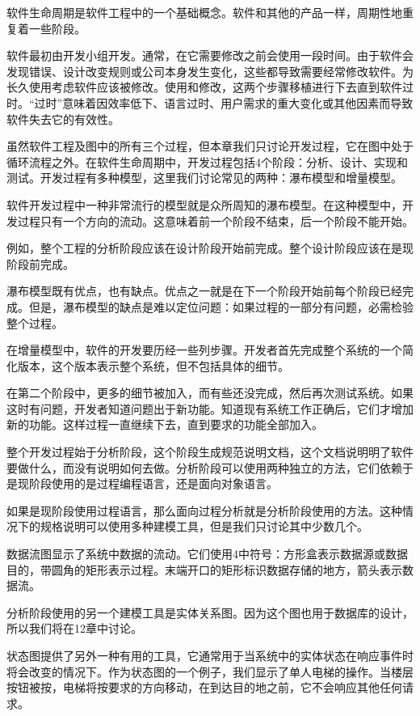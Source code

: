 软件生命周期是软件工程中的一个基础概念。软件和其他的产品一样，周期性地重复着一些阶段。

软件最初由开发小组开发。通常，在它需要修改之前会使用一段时间。由于软件会发现错误、设计改变规则或公司本身发生变化，这些都导致需要经常修改软件。为长久使用考虑软件应该被修改。使用和修改，这两个步骤移植进行下去直到软件过时。“过时”意味着因效率低下、语言过时、用户需求的重大变化或其他因素而导致软件失去它的有效性。

虽然软件工程及图中的所有三个过程，但本章我们只讨论开发过程，它在图中处于循环流程之外。在软件生命周期中，开发过程包括4个阶段：分析、设计、实现和测试。开发过程有多种模型，这里我们讨论常见的两种：瀑布模型和增量模型。

软件开发过程中一种非常流行的模型就是众所周知的瀑布模型。在这种模型中，开发过程只有一个方向的流动。这意味着前一个阶段不结束，后一个阶段不能开始。

例如，整个工程的分析阶段应该在设计阶段开始前完成。整个设计阶段应该在是现阶段前完成。

瀑布模型既有优点，也有缺点。优点之一就是在下一个阶段开始前每个阶段已经完成。但是，瀑布模型的缺点是难以定位问题：如果过程的一部分有问题，必需检验整个过程。

在增量模型中，软件的开发要历经一些列步骤。开发者首先完成整个系统的一个简化版本，这个版本表示整个系统，但不包括具体的细节。

在第二个阶段中，更多的细节被加入，而有些还没完成，然后再次测试系统。如果这时有问题，开发者知道问题出于新功能。知道现有系统工作正确后，它们才增加新的功能。这样过程一直继续下去，直到要求的功能全部加入。

整个开发过程始于分析阶段，这个阶段生成规范说明文档，这个文档说明明了软件要做什么，而没有说明如何去做。分析阶段可以使用两种独立的方法，它们依赖于是现阶段使用的是过程编程语言，还是面向对象语言。

如果是现阶段使用过程语言，那么面向过程分析就是分析阶段使用的方法。这种情况下的规格说明可以使用多种建模工具，但是我们只讨论其中少数几个。

数据流图显示了系统中数据的流动。它们使用4中符号：方形盒表示数据源或数据目的，带圆角的矩形表示过程。末端开口的矩形标识数据存储的地方，箭头表示数据流。

分析阶段使用的另一个建模工具是实体关系图。因为这个图也用于数据库的设计，所以我们将在12章中讨论。

状态图提供了另外一种有用的工具，它通常用于当系统中的实体状态在响应事件时将会改变的情况下。作为状态图的一个例子，我们显示了单人电梯的操作。当楼层按钮被按，电梯将按要求的方向移动，在到达目的地之前，它不会响应其他任何请求。

